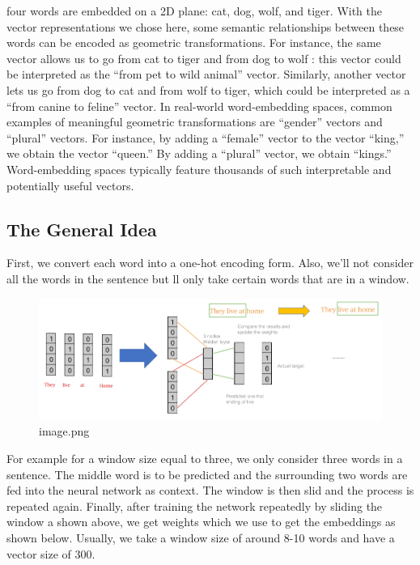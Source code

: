 \documentclass[11pt]{article}
\begin{document}
    four words are embedded on a 2D plane: cat, dog, wolf, and tiger. With
the vector representations we chose here, some semantic relationships
between these words can be encoded as geometric transformations. For
instance, the same vector allows us to go from cat to tiger and from dog
to wolf : this vector could be interpreted as the ``from pet to wild
animal'' vector. Similarly, another vector lets us go from dog to cat
and from wolf to tiger, which could be interpreted as a ``from canine to
feline'' vector. In real-world word-embedding spaces, common examples of
meaningful geometric transformations are ``gender'' vectors and
``plural'' vectors. For instance, by adding a ``female'' vector to the
vector ``king,'' we obtain the vector ``queen.'' By adding a ``plural''
vector, we obtain ``kings.'' Word-embedding spaces typically feature
thousands of such interpretable and potentially useful vectors.

    \hypertarget{the-general-idea}{%
\subsection{The General Idea}\label{the-general-idea}}

    First, we convert each word into a one-hot encoding form. Also, we'll
not consider all the words in the sentence but ll only take certain
words that are in a window.

    \begin{figure}
\centering
\includegraphics{./img/word-embedding-1.png}
\caption{image.png}
\end{figure}

    For example for a window size equal to three, we only consider three
words in a sentence. The middle word is to be predicted and the
surrounding two words are fed into the neural network as context. The
window is then slid and the process is repeated again. Finally, after
training the network repeatedly by sliding the window a shown above, we
get weights which we use to get the embeddings as shown below. Usually,
we take a window size of around 8-10 words and have a vector size of
300.
\end{document}
